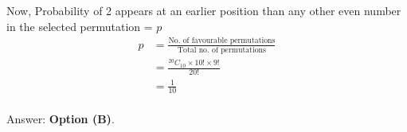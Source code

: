 \documentclass[journal,12pt,twocolumn]{IEEEtran}
\begin{document}
Now, Probability of 2 appears at an earlier position than any other even number in the selected permutation = \(p\)\newline
\begin{align}
    p &= \frac{\text{No. of favourable permutations}}{\text{Total no. of permutations}}\nonumber\\
    &= \frac{{}^{20}C_{10}\times10!\times9!}{20!}\\
    &= \frac{1}{10}\\\nonumber
\end{align}

\begin{flushright}
    Answer: \textbf{Option (B)}.
\end{flushright}
\end{document}
